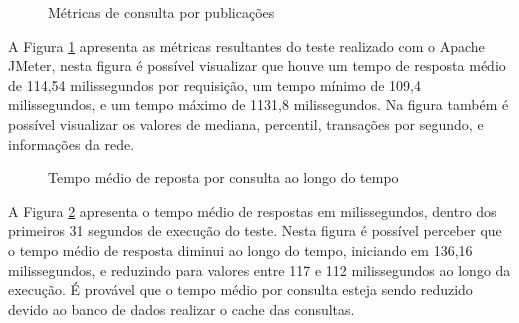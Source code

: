 \begin{figure}[H]
    \caption{Métricas de consulta por publicações}
    \label{fig:matrics-advanced-search}
\end{figure}

A Figura \ref{fig:matrics-advanced-search} apresenta as métricas resultantes do teste
realizado com o Apache JMeter, nesta figura é possível visualizar que houve um tempo de
resposta médio de 114,54 milissegundos por requisição, um tempo mínimo de 109,4
milissegundos, e um tempo máximo de 1131,8 milissegundos. Na figura também é possível
visualizar os valores de mediana, percentil, transações por segundo, e informações da
rede.

\begin{figure}[H]
    \caption{Tempo médio de reposta por consulta ao longo do tempo}
    \centering
    \label{fig:search-response-over-time}
\end{figure}

A Figura \ref{fig:search-response-over-time} apresenta o tempo médio de respostas
em milissegundos, dentro dos primeiros 31 segundos de execução do teste. Nesta figura
é possível perceber que o tempo médio de resposta diminui ao longo do tempo, iniciando
em 136,16 milissegundos, e reduzindo para valores entre 117 e 112 milissegundos ao longo
da execução. É provável que o tempo médio por consulta esteja sendo reduzido devido ao
banco de dados realizar o cache das consultas.

